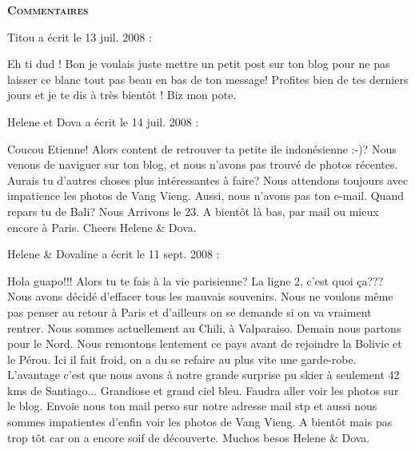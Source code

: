 \bigskip
\textbf{\textsc{Commentaires}}

\medskip
Titou a écrit le 13 juil. 2008 :
\begin{displayquote}
Eh ti dud !
Bon je voulais juste mettre un petit post sur ton blog pour ne pas laisser ce blanc tout pas beau en bas de ton message! Profites bien de tes derniers jours et je te dis à très bientôt !
Biz mon pote.
\end{displayquote}

\medskip
Helene et Dova a écrit le 14 juil. 2008 :
\begin{displayquote}
Coucou Etienne!
Alors content de retrouver ta petite ile indonésienne :-)?
Nous venons de naviguer sur ton blog, et nous n'avons pas trouvé de photos récentes. Aurais tu d'autres choses plus intéressantes à faire?
Nous attendons toujours avec impatience les photos de Vang Vieng.
Aussi, nous n'avons pas ton e-mail.
Quand repars tu de Bali? Nous Arrivons le 23.
A bientôt là bas, par mail ou mieux encore à Paris.
Cheers Helene \& Dova.
\end{displayquote}

\medskip
Helene \& Dovaline a écrit le 11 sept. 2008 :
\begin{displayquote}
Hola guapo!!!
Alors tu te fais à la vie parisienne? La ligne 2, c'est quoi ça??? Nous avons décidé d'effacer tous les mauvais souvenirs. Nous ne voulons même pas penser au retour à Paris et d'ailleurs on se demande si on va vraiment rentrer.
Nous sommes actuellement au Chili, à Valparaiso. Demain nous partons pour le Nord. Nous remontons lentement ce pays avant de rejoindre la Bolivie et le Pérou. Ici il fait froid, on a du se refaire au plus vite une garde-robe. L'avantage c'est que nous avons à notre grande surprise pu skier à seulement 42 kms de Santiago... Grandiose et grand ciel bleu. Faudra aller voir les photos sur le blog.
Envoie nous ton mail perso sur notre adresse mail stp et aussi nous sommes impatientes d'enfin voir les photos de Vang Vieng.
A bientôt mais pas trop tôt car on a encore soif de découverte.
Muchos besos
Helene \& Dova.
\end{displayquote}

\vfill
